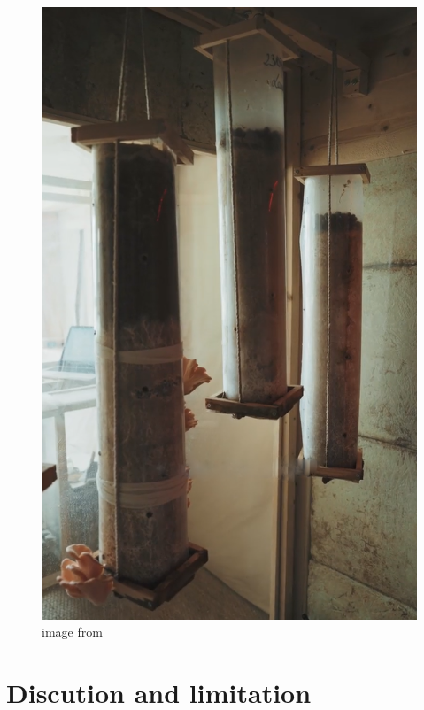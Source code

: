 \begin{figure}[h]
    \centering
    \includegraphics{images/lowtechdouche2.png}
    \caption{image from \cite{lowtechmyco}}
    \label{fig:blasttrash}
\end{figure} 


\section{Discution and limitation}
